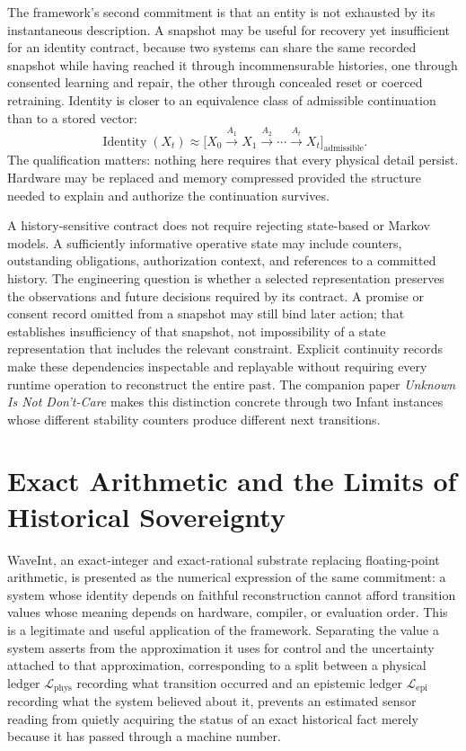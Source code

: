 \documentclass[11pt]{article}
\begin{document}
The framework's second commitment is that an entity is not exhausted by its instantaneous description. A snapshot may be useful for recovery yet insufficient for an identity contract, because two systems can share the same recorded snapshot while having reached it through incommensurable histories, one through consented learning and repair, the other through concealed reset or coerced retraining. Identity is closer to an equivalence class of admissible continuation than to a stored vector:
\[
\operatorname{Identity}(X_t) \approx \bigl[X_0 \xrightarrow{A_1} X_1 \xrightarrow{A_2} \cdots \xrightarrow{A_t} X_t\bigr]_{\text{admissible}}.
\]
The qualification matters: nothing here requires that every physical detail persist. Hardware may be replaced and memory compressed provided the structure needed to explain and authorize the continuation survives.

A history-sensitive contract does not require rejecting state-based or Markov models. A sufficiently informative operative state may include counters, outstanding obligations, authorization context, and references to a committed history. The engineering question is whether a selected representation preserves the observations and future decisions required by its contract. A promise or consent record omitted from a snapshot may still bind later action; that establishes insufficiency of that snapshot, not impossibility of a state representation that includes the relevant constraint. Explicit continuity records make these dependencies inspectable and replayable without requiring every runtime operation to reconstruct the entire past. The companion paper \emph{Unknown Is Not Don't-Care} makes this distinction concrete through two Infant instances whose different stability counters produce different next transitions.

\section{Exact Arithmetic and the Limits of Historical Sovereignty}

WaveInt, an exact-integer and exact-rational substrate replacing floating-point arithmetic, is presented as the numerical expression of the same commitment: a system whose identity depends on faithful reconstruction cannot afford transition values whose meaning depends on hardware, compiler, or evaluation order. This is a legitimate and useful application of the framework. Separating the value a system asserts from the approximation it uses for control and the uncertainty attached to that approximation, corresponding to a split between a physical ledger $\mathcal{L}_{\text{phys}}$ recording what transition occurred and an epistemic ledger $\mathcal{L}_{\text{epi}}$ recording what the system believed about it, prevents an estimated sensor reading from quietly acquiring the status of an exact historical fact merely because it has passed through a machine number.
\end{document}
